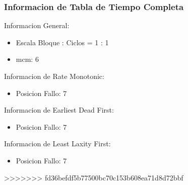 \documentclass[xcolor=table]{beamer}
\begin{document}
\begin{frame} 
\frametitle{Informacion de Tabla de Tiempo Completa} 
Informacion General:\\ 
\begin{itemize} 
\item Escala Bloque : Ciclos = 1 : 1 \\ 
\item mcm:  6 \\ 
\end{itemize} 
Informacion de Rate Monotonic:\\ 
\begin{itemize} 
\item Posicion Fallo:  7 \\ 
\end{itemize} 
Informacion de Earliest Dead First:\\ 
\begin{itemize} 
\item Posicion Fallo:  7 \\ 
\end{itemize} 
Informacion de Least Laxity First:\\ 
\begin{itemize} 
\item Posicion Fallo:  7 \\ 
\end{itemize} 
>>>>>>> fd36befdf5b77500bc70c153b608ea71d8d72bbf
\end{frame} 

\end{document}
